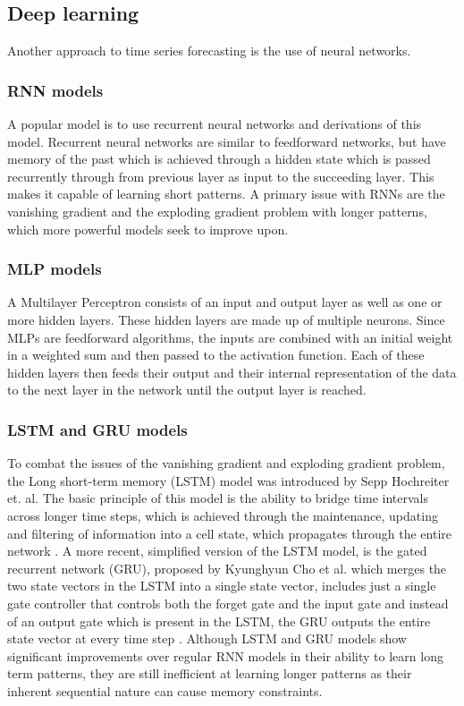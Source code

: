 \subsection{Deep learning}
Another approach to time series forecasting is the use of neural networks.
\subsubsection{RNN models}
A popular model is to use recurrent neural networks and derivations of this model. Recurrent neural networks are similar to feedforward networks, but have memory of the past which is achieved through a hidden state which is passed recurrently through from previous layer as input to the succeeding layer. This makes it capable of learning short patterns. 
A primary issue with RNNs are the vanishing gradient and the exploding gradient problem with longer patterns, which more powerful models seek to improve upon. \cite{AIModernApproach}\cite{hands-onML}

\subsubsection{MLP models}
A Multilayer Perceptron consists of an input and output layer as well as one or more hidden layers. These hidden layers are made up of multiple neurons. 
Since MLPs are feedforward algorithms, the inputs are combined with an initial weight in a weighted sum and then passed to the activation function. 
Each of these hidden layers then feeds their output and their internal representation of the data to the next layer in the network until the output layer is reached.\cite{bentoMultilayerPerceptronExplained2021}

\subsubsection{LSTM and GRU models}
To combat the issues of the vanishing gradient and exploding gradient problem, the Long short-term memory (LSTM) model was introduced by Sepp Hochreiter et. al. The basic principle of this model is the ability to bridge time intervals across longer time steps, which is achieved through the maintenance, updating and filtering of information into a cell state, which propagates through the entire network \cite{LSTMPaper}. 
A more recent, simplified version of the LSTM model, is the gated recurrent network (GRU), proposed by Kyunghyun Cho et al. which merges the two state vectors in the LSTM into a single state vector, includes just a single gate controller that controls both the forget gate and the input gate and instead of an output gate which is present in the LSTM, the GRU outputs the entire state vector at every time step\cite{RNNPaper} \cite{hands-onML}.
Although LSTM and GRU models show significant improvements over regular RNN models in their ability to learn long term patterns, they are still inefficient at learning longer patterns as their inherent sequential nature can cause memory constraints\cite{AttentionIsAllYouNeed}. 